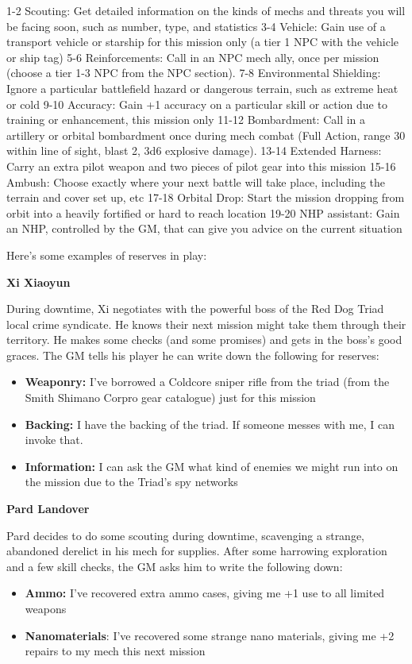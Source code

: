  1-2       Scouting: Get detailed information on the kinds of mechs and threats you will be
           facing soon, such as number, type, and statistics
 3-4       Vehicle: Gain use of a transport vehicle or starship for this mission only (a tier 1 NPC
           with the vehicle or ship tag)
 5-6       Reinforcements: Call in an NPC mech ally, once per mission (choose a tier 1-3 NPC
           from the NPC section).
 7-8       Environmental Shielding: Ignore a particular battlefield hazard or dangerous terrain,
           such as extreme heat or cold
 9-10      Accuracy: Gain +1 accuracy on a particular skill or action due to training or
           enhancement, this mission only
 11-12     Bombardment: Call in a artillery or orbital bombardment once during mech combat
           (Full Action, range 30 within line of sight, blast 2, 3d6 explosive damage).
 13-14     Extended Harness: Carry an extra pilot weapon and two pieces of pilot gear into this
           mission
 15-16     Ambush: Choose exactly where your next battle will take place, including the terrain
           and cover set up, etc
 17-18     Orbital Drop: Start the mission dropping from orbit into a heavily fortified or hard to
           reach location
 19-20     NHP assistant: Gain an NHP, controlled by the GM, that can give you advice on the
           current situation

Here's some examples of reserves in play:

\textbf{Xi Xiaoyun}

During downtime, Xi negotiates with the powerful boss of the Red Dog Triad local crime syndicate. He knows their next mission might take them through their territory. He makes some checks (and some promises) and gets in the boss's good graces. The GM tells his player he can write down the following for reserves:
\begin{itemize}
\item \textbf{Weaponry:} I've borrowed a Coldcore sniper rifle from the triad (from the Smith Shimano Corpro gear catalogue) just for this mission
\item \textbf{Backing:} I have the backing of the triad. If someone messes with me, I can invoke that.
\item \textbf{Information:} I can ask the GM what kind of enemies we might run into on the mission due to the Triad's spy networks
\end{itemize}  

\textbf{Pard Landover}

Pard decides to do some scouting during downtime, scavenging a strange, abandoned derelict in his mech for supplies. After some harrowing exploration and a few skill checks, the GM asks him to write the following down:
\begin{itemize}
\item \textbf{Ammo:} I've recovered extra ammo cases, giving me +1 use to all limited weapons
\item \textbf{Nanomaterials}: I've recovered some strange nano materials, giving me +2 repairs to my mech this next mission
\end{itemize}  

